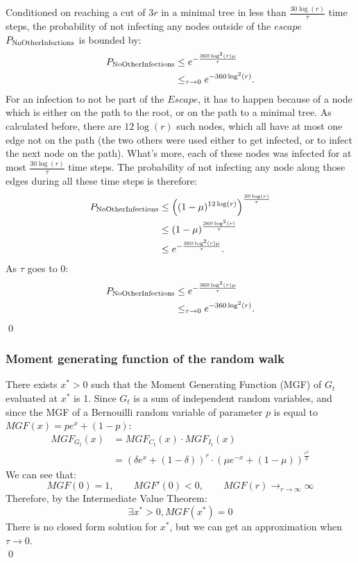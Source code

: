 \begin{proposition} \label{cl:noOtherInfection} 
	Conditioned on reaching a cut of $3r$ in a minimal tree in less than $\frac{30\log(r)}{\tau}$ time steps, the probability of not infecting any nodes outside of the $escape$ $P_{\rm NoOtherInfections}$ is bounded by:
	\begin{align*}
	P_{\rm NoOtherInfections} &\leq e^{-\frac{360\log^2(r)\mu}{\tau}} \\
	&\leq_{\tau \to 0} e^{-360\log^2(r)}.
	\end{align*}
	\proof
	For an infection to not be part of the $Escape$, it has to happen because of a node which is either on the path to the root, or on the path to a minimal tree. As calculated before, there are $12\log(r)$ such nodes, which all have at most one edge not on the path (the two others were used either to get infected, or to infect the next node on the path). What's more, each of these nodes was infected for at most $\frac{30\log(r)}{\tau}$ time steps. The probability of not infecting any node along those edges during all these time steps is therefore:
	\begin{align*}
	P_{\rm NoOtherInfections} &\leq \left((1-\mu)^{12\log(r)} \right)^{\frac{30\log(r)}{\tau}} \\
	&\leq (1-\mu)^{\frac{360\log^2(r)}{\tau}} \\
	&\leq e^{-\frac{360\log^2(r)\mu}{\tau}}.
	\end{align*}
	As $\tau$ goes to 0:
	\begin{align*}
	P_{\rm NoOtherInfections} &\leq  e^{-\frac{360\log^2(r)\mu}{\tau}} \\
	&\leq_{\tau \to 0} e^{-360\log^2(r)}.
	\end{align*}
	\qed
\end{proposition}

\subsubsection{Moment generating function of the random walk}

\begin{proposition} \label{cl:MGF}
There exists $x^*>0$ such that the Moment Generating Function (MGF) of $G_t$ evaluated at $x^*$ is 1.
\proof Since $G_t$ is a sum of independent random variables, and since the MGF of a Bernouilli random variable of parameter $p$ is equal to $MGF(x) = pe^x +(1-p)$:
\begin{align*}
MGF_{G_t}(x) &= MGF_{C_t}(x) \cdot MGF_{I_t}(x) \\
&= (\delta e^x + (1 - \delta))^r\cdot (\mu e^{-x} + (1 - \mu))^\frac{r^3}{3}
\end{align*}
We can see that:
 $$MGF(0) = 1, \qquad MGF'(0) < 0, \qquad MGF(r) \to_{r \to \infty} \infty$$
Therefore, by the Intermediate Value Theorem:
$$ \exists x^* > 0, MGF(x^*) = 0 $$
There is no closed form solution for $x^*$, but we can get an approximation when $\tau \to 0$. \\\qed 
\end{proposition}


